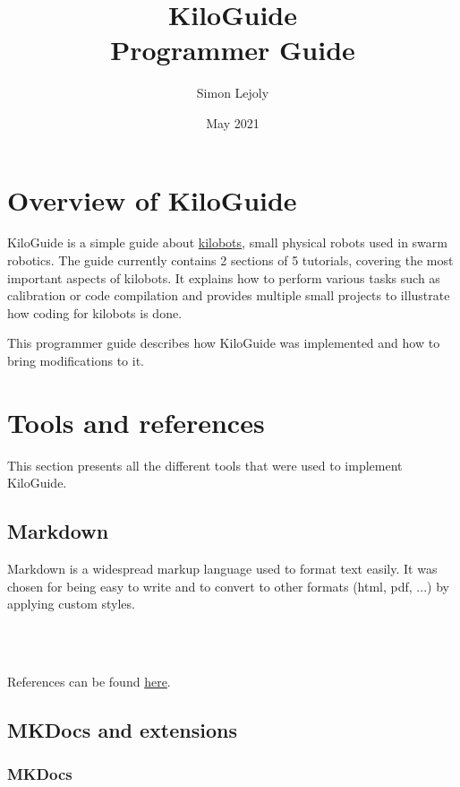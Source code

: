 \documentclass[a4paper,12pt,titlepage]{scrartcl}
\title{\textbf{KiloGuide}\\Programmer Guide}
\author{Simon Lejoly}
\date{May 2021}
\begin{document}
\maketitle

\newpage

\tableofcontents

\newpage

\section{Overview of KiloGuide}

KiloGuide is a simple guide about \href{https://kilobotics.com}{kilobots}, small physical robots used in swarm robotics. The guide currently contains 2 sections of 5 tutorials, covering the most important aspects of kilobots. It explains how to perform various tasks such as calibration or code compilation and provides multiple small projects to illustrate how coding for kilobots is done.

This programmer guide describes how KiloGuide was implemented and how to bring modifications to it.

\section{Tools and references}

This section presents all the different tools that were used to implement KiloGuide.

\subsection{Markdown}

Markdown is a widespread markup language used to format text easily. It was chosen for being easy to write and to convert to other formats (html, pdf, ...) by applying custom styles.

\\\

References can be found \href{https://daringfireball.net/projects/markdown/}{here}.

\subsection{MKDocs and extensions}

\subsubsection{MKDocs}
\end{document}
